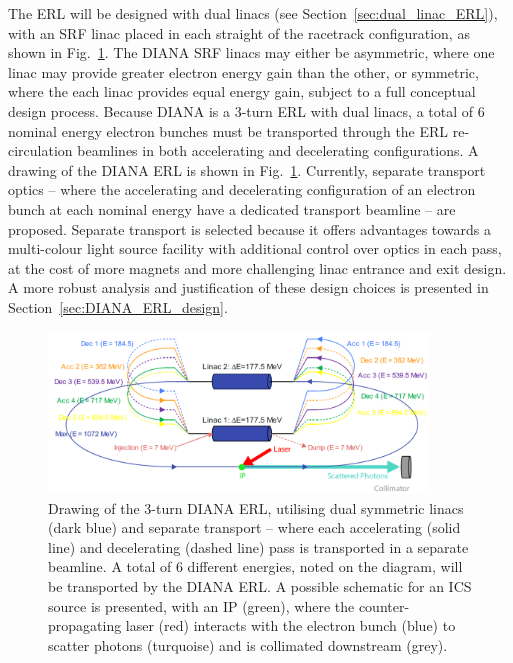 \documentclass[../main.tex]{subfiles}
\begin{document}
The ERL will be designed with dual linacs (see Section~\ref{sec:dual_linac_ERL}), with an SRF linac placed in each straight of the racetrack configuration, as shown in Fig.~\ref{fig:DIANA_ERL_diagram}. The DIANA SRF linacs may either be asymmetric, where one linac may provide greater electron energy gain than the other, or symmetric, where the each linac provides equal energy gain, subject to a full conceptual design process. Because DIANA is a 3-turn ERL with dual linacs, a total of 6 nominal energy electron bunches must be transported through the ERL re-circulation beamlines in both accelerating and decelerating configurations. A drawing of the DIANA ERL is shown in Fig.~\ref{fig:DIANA_ERL_diagram}. Currently, separate transport optics -- where the accelerating and decelerating configuration of an electron bunch at each nominal energy have a dedicated transport beamline -- are proposed. Separate transport is selected because it offers advantages towards a multi-colour light source facility with additional control over optics in each pass, at the cost of more magnets and more challenging linac entrance and exit design. A more robust analysis and justification of these design choices is presented in Section~\ref{sec:DIANA_ERL_design}. 
\begin{figure}[!h]
\centering
\includegraphics[width=0.9\textwidth]{Figures/DIANA_Inverse_Compton_Source_Design/DIANA_diagram_fixed.pdf}
\caption{Drawing of the 3-turn DIANA ERL, utilising dual symmetric linacs (dark blue) and separate transport -- where each accelerating (solid line) and decelerating (dashed line) pass is transported in a separate beamline. A total of 6 different energies, noted on the diagram, will be transported by the DIANA ERL. A possible schematic for an ICS source is presented, with an IP (green), where the counter-propagating laser (red) interacts with the electron bunch (blue) to scatter photons (turquoise) and is collimated downstream (grey).}
\label{fig:DIANA_ERL_diagram}
\end{figure}
\end{document}
